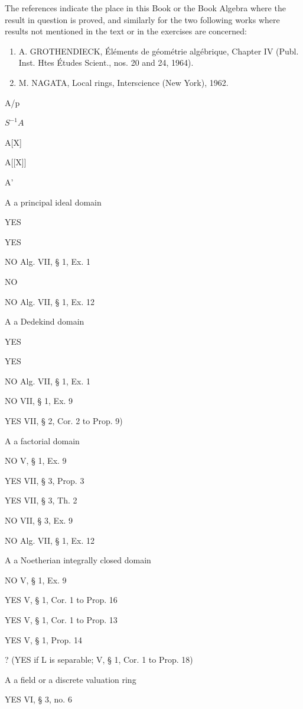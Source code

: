 The references indicate the place in this Book or the Book Algebra where the result in question is proved, and similarly for the two following works where results not mentioned in the text or in the exercises are concerned:

\begin{enumerate}
\def\labelenumi{(\arabic{enumi})}
\item
  A. GROTHENDIECK, Éléments de géométrie algébrique, Chapter IV (Publ. Inst. Htes Études Scient., nos. 20 and 24, 1964).
\item
  M. NAGATA, Local rings, Interscience (New York), 1962.
\end{enumerate}

A/p

\(S^{-1}A\)

A{[}X{]}

A{[}{[}X{]}{]}

A'

A a principal ideal domain

YES

YES

NO Alg. VII, § 1, Ex. 1

NO

NO Alg. VII, § 1, Ex. 12

A a Dedekind domain

YES

YES

NO Alg. VII, § 1, Ex. 1

NO VII, § 1, Ex. 9

YES VII, § 2, Cor. 2 to Prop. 9)

A a factorial domain

NO V, § 1, Ex. 9

YES VII, § 3, Prop. 3

YES VII, § 3, Th. 2

NO VII, § 3, Ex. 9

NO Alg. VII, § 1, Ex. 12

A a Noetherian integrally closed domain

NO V, § 1, Ex. 9

YES V, § 1, Cor. 1 to Prop. 16

YES V, § 1, Cor. 1 to Prop. 13

YES V, § 1, Prop. 14

? (YES if L is separable; V, § 1, Cor. 1 to Prop. 18)

A a field or a discrete valuation ring

YES VI, § 3, no. 6

